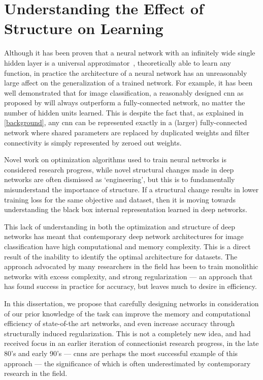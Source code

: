 \documentclass[thesis]{subfiles}
\begin{document}
\section{Understanding the Effect of Structure on Learning}
Although it has been proven that a neural network with an infinitely wide single hidden layer is a universal approximator~\citep{journals/mcss/Cybenko92,hornik89a},  theoretically able to learn any function, in practice the architecture of a neural network has an unreasonably large affect on the generalization of a trained network. For example, it has been well demonstrated that for image classification, a reasonably designed \gls{cnn} as proposed by \citet{Lecun1998} will always outperform a fully-connected network, no matter the number of hidden units learned. This is despite the fact that, as explained in \cref{background}, any \gls{cnn} can be represented exactly in a (larger) fully-connected network where shared parameters are replaced by duplicated weights and filter connectivity is simply represented by zeroed out weights.

Novel work on optimization algorithms used to train neural networks is considered research progress, while novel structural changes made in deep networks are often dismissed as `engineering', but this is to fundamentally misunderstand the importance of structure. If a structural change results in lower training loss for the same objective and dataset, then it is moving towards understanding the black box internal representation learned in deep networks. %

This lack of understanding in both the optimization and structure of deep networks has meant that contemporary deep network architectures for image classification have high computational and memory complexity. This is a direct result of the inability to identify the optimal architecture for datasets. The approach advocated by many researchers in the field has been to train monolithic networks with excess complexity, and strong regularization --- an approach that has found success in practice for accuracy, but leaves much to desire in efficiency.

In this dissertation, we propose that carefully designing networks in consideration of our prior knowledge of the task can improve the memory and computational efficiency of state-of-the art networks, and even increase accuracy through structurally induced regularization. This is not a completely new idea, and had received focus in an earlier iteration of connectionist research progress, in the late 80's and early 90's --- \glspl{cnn} are perhaps the most successful example of this approach --- the significance of which is often underestimated by contemporary research in the field.
\end{document}
